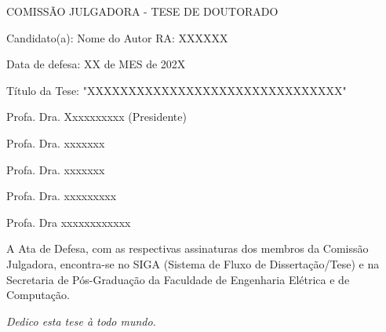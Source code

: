 %
% 
%
\begin{folhadeaprovacao}

  \begin{center}
    COMISS\~{A}O JULGADORA - TESE DE DOUTORADO
\end{center}
\noindent
\begin{minipage}{\textwidth}\SingleSpacing
Candidato(a): Nome do Autor      RA: XXXXXX

Data de defesa: XX de MES de 202X

T\'{i}tulo da Tese: "XXXXXXXXXXXXXXXXXXXXXXXXXXXXXXX"
\vspace{2cm}

Profa. Dra. Xxxxxxxxxx (Presidente)

Profa. Dra. xxxxxxx

Profa. Dra. xxxxxxx

Profa. Dra. xxxxxxxxx

Profa. Dra xxxxxxxxxxxx

\vspace{2cm}

A Ata de Defesa, com as respectivas assinaturas dos membros da Comiss\~{a}o Julgadora, encontra-se no SIGA (Sistema de Fluxo de Disserta\c{c}\~{a}o/Tese) e na Secretaria de P\'{o}s-Gradua\c{c}\~{a}o da Faculdade de Engenharia El\'{e}trica e de Computa\c{c}\~{a}o.
\end{minipage}

\end{folhadeaprovacao}

\begin{dedicatoria}
   \vspace*{\fill}
   \centering
   \noindent
   \textit{ Dedico esta tese \`{a} todo mundo.} \vspace*{\fill}
\end{dedicatoria}

